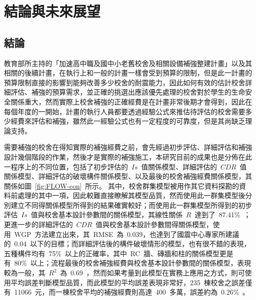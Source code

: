 \renewcommand\thetable{\arabic{chapter}-\arabic{table}}
\chapter{結論與未來展望}
\label{cha:conclusions}

\section{結論}

教育部所主持的「加速高中職及國中小老舊校舍及相關設備補強整建計畫」以及其相關的後續計畫，在執行上和一般的計畫一樣會受到預算的限制，但是此一計畫的預算限制直接的影響到能夠改善多少校舍的耐震能力，因此如何有效的估計校舍詳細評估、補強的預算需求，並正確的挑選出應該優先處理的校舍對於學生的生命安全關係重大，然而實際上校舍補強的正確經費是在計畫非常後期才會得到，因此在每個年度的一開始，計畫的執行人員都要透過經驗公式來推估待評估的校舍需要多少經費來評估和補強，雖然此一經驗公式也有一定程度的可靠度，但是其尚缺乏理論支持。

需要補強的校舍在得知實際的補強經費之前，會先經過初步評估、詳細評估和補強設計幾個階段的作業，然後才是實際的補強施工，本研究目前的成果也是分佈在此一程序上的不同位置，包括了初步評估的~$Is$~值關係模型、詳細評估的~$CDR$~值關係模型、詳細評估的破壞構件關係模型、以及最後的校舍補強經費關係模型，其關係如圖~\ref{fig:FLOW-con}~所示。
其中，校舍群集模型被用作其它資料探勘的資料前處理的其中一項，因此較難直接瞭解其模型品質，然而使用此一群集模型後分別建立不同得關係模型所得到的結果確實較好；而使用此一群集模型所得到的初步評估~$Is$~值與校舍基本設計參數間的關係模型，其線性關係~$R$~達到了~87.41\%~；更進一步的詳細評估的~$CDR$~值與校舍基本設計參數間得關係模型，使用~WGP~方法建立出來，其~RMSE~為~0.039，也達到了國震中心專家所建議的~0.04~以下的目標；而詳細評估後的構件破壞情形的模型，也有很不錯的表現，五種構件均有~75\%~以上的正確率，其中~RC~牆、磚牆和柱的關係模型更是有~80\%~以上；流程最後的校舍補強經費與校舍基本設計參數間的關係模型，表現較為一般，其~$R^2$~為~0.69~，然而如果考量到此模型在實務上應用之方式，則可使用平均誤差判斷模型品質，而此模型的平均誤差表現非常好，235~棟校舍之誤差僅有~11066~元，而一棟校舍平均的補強經費則高達~400~多萬，誤差約為~0.26\%~。

